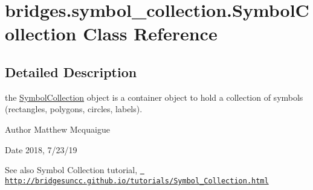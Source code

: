 \hypertarget{classbridges_1_1symbol__collection_1_1_symbol_collection}{}\section{bridges.\+symbol\+\_\+collection.\+Symbol\+Collection Class Reference}
\label{classbridges_1_1symbol__collection_1_1_symbol_collection}


\subsection{Detailed Description}
the \mbox{\hyperlink{classbridges_1_1symbol__collection_1_1_symbol_collection}{Symbol\+Collection}} object is a container object to hold a collection of symbols (rectangles, polygons, circles, labels). 

\begin{DoxyAuthor}{Author}
Matthew Mcquaigue
\end{DoxyAuthor}
\begin{DoxyDate}{Date}
2018, 7/23/19
\end{DoxyDate}
\begin{DoxySeeAlso}{See also}
Symbol Collection tutorial, \href{http://bridgesuncc.github.io/tutorials/Symbol_Collection.html}{\texttt{ http\+://bridgesuncc.\+github.\+io/tutorials/\+Symbol\+\_\+\+Collection.\+html}} 
\end{DoxySeeAlso}
